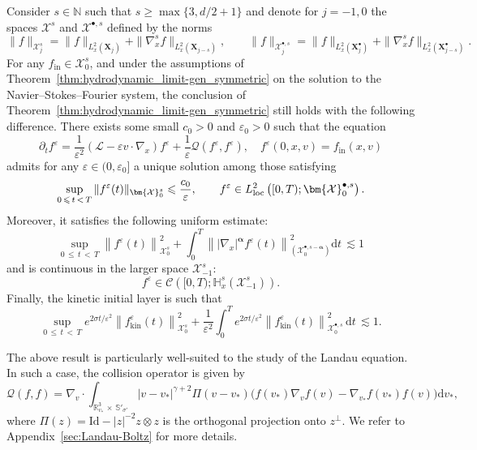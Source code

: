 \documentclass[AHL,Unicode,longabstracts,published]{cedram}
\newcommand{\ini}{\mathrm{in}}
\newcommand{\kin}{\mathrm{kin}}
\newcommand{\Id}{\mathrm{Id}}
\renewcommand{\d}{\mathrm{d}}
\newcommand{\R}{\mathbb{R}}
\renewcommand{\S}{\mathbb{S}}
\newcommand{\N}{\mathbb{N}}
\newcommand{\bbH}{\mathbb{H}}
\newcommand{\CC}{\mathcal{C}}
\newcommand{\XX}{\mathcal{X}}
\newcommand{\LL}{\mathcal{L}}
\newcommand{\QQ}{\mathcal{Q}}
\newcommand{\Sh}{\bm{X}}
\newcommand{\Shp}{\bm{X}^{\bullet}}
\newcommand{\rSSh}[1]{\bm{\XX}^{#1}}
\newcommand{\rSShp}[1]{\bm{\XX}^{\bullet, #1}}
\renewcommand*\le{\leqslant}
\renewcommand*\ge{\geqslant}
\newcommand*\eps{{\varepsilon}}
\begin{document}
\begin{theo}\label{thm:hydrodynamic_limit-gen_degenerate}
Consider $s \in \N$ such that $s \ge \max\{3, d/2 + 1\}$ and denote for $j = -1, 0$ the spaces $\rSSh{s}$ and $\rSShp{s}$ defined by the norms
\[
\|f\|_{\rSSh{s}_j} = \| f \|_{ L^2_x \left(\Sh_j \right) } + \| \nabla_x^s f \|_{ L^2_x\left(\Sh_{j-s}\right) },
\qquad \|f\|_{\rSShp{s}_j} = \| f \|_{ L^2_x \left(\Shp_j \right) } + \| \nabla_x^s f \|_{ L^2_x \left(\Shp_{j-s}\right) }.
\]
For any $f_\ini \in \rSSh{s}_0$, and under the assumptions of Theorem~\ref{thm:hydrodynamic_limit-gen_symmetric} on the solution to the Navier--Stokes--Fourier system, the conclusion of Theorem~\ref{thm:hydrodynamic_limit-gen_symmetric} still holds with the following difference. There exists some small $c_0 > 0$ and $\eps_0 > 0$ such that the equation
\[
\partial_t f^\eps = \frac{1}{\eps^2} \left(\LL - \eps v \cdot \nabla_x \right) f^\eps + \frac{1}{\eps} \QQ\left(f^\eps, f^\eps \right), \quad f^\eps(0, x, v) = f_\ini(x, v)
\]
admits for any $\eps \in (0, \eps_0]$ a unique solution among those satisfying
\[
\sup_{0\,\le\,t\,<\,T} \| f^\eps(t) \|_{ \rSSh{s}_0 } \le \frac{c_0}{\eps}, \qquad f^\eps \in L^2_{\rm{loc}} \left([0, T) ; \rSShp{s}_0 \right).
\]
Moreover, it satisfies the following uniform estimate:
\[
\sup_{0\,\le\,t\,<\,T} \left\| f^\eps(t) \right\|_{ \rSSh{s}_0 }^2 + \int_0^T \left\| | \nabla_x |^{ \bm \alpha } f^\eps(t) \right\|_{ \left(\rSShp{s-\boldsymbol{\alpha}}_0 \right) }^2 \d t \, \lesssim 1
\]
and is continuous in the larger space $\rSSh{s}_{-1}$:
\[
f^\eps \in \CC\left([0, T) ; \bbH^s_x \left(\rSSh{s}_{-1} \right) \right).
\]
Finally, the kinetic initial layer is such that
\[
\sup_{0\,\le\,t\,<\,T} e^{2 \sigma t / \eps^2} \left\| f^\eps_\kin(t) \right\|_{ \rSSh{s}_0 }^2 + \frac{1}{\eps^2} \int_0^T e^{2 \sigma t / \eps^2} \left\| f^\eps_\kin(t) \right\|_{ \rSShp{s}_0 }^2 \, \d t \, {\lesssim 1}.
\]
\end{theo}

\begin{exem}
The above result is particularly well-suited to the study of the Landau equation. In such a case, the collision operator is given by
\begin{equation*}
\QQ(f, f) = \nabla_v \cdot \int_{\R^3_{v_*}\,\times\,\S'_{\sigma'}} | v - v_* |^{\gamma+2} \Pi(v-v_*) \Big(f(v_*) \nabla_v f(v) - \nabla_{v_*} f(v_*) f(v) \Big) \d v_*,
\end{equation*}
where $\Pi(z) = \Id - |z|^{-2} z \otimes z$ is the orthogonal projection onto $z^\perp$. We refer to Appendix~\ref{sec:Landau-Boltz} for more details.
\end{exem}
\end{document}

